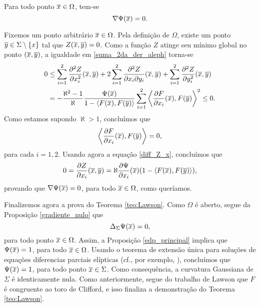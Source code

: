 \begin{proposicao} \label{gradiente_nulo}
Para todo ponto $\overline{x}\in\Omega$, tem-se
\[
\nabla \Psi(\overline{x})=0.
\] 
\end{proposicao}
\begin{demonstracao}
Fixemos um ponto arbitr\'ario $\overline{x}\in\Omega$. Pela defini\c c\~ao
de $\Omega$, existe um ponto $\overline{y}\in\Sigma\setminus\{x\}$ tal que 
$Z(\overline{x},\overline{y})=0$. Como a fun\c c\~ao $Z$ atinge seu m\'inimo
global no ponto $(\overline{x},\overline{y})$, a igualdade em 
\eqref{suma_2da_der_aleph} torna-se
\begin{equation*} 
\begin{aligned}
0 & \leq
\sum_{i=1}^2 \frac{\partial^2 Z}{\partial x_i^2}(\overline{x},\overline{y}) + 
2 \sum_{i=1}^2 \frac{\partial^2 Z}{\partial x_i \partial y_i}(\overline{x},\overline{y}) + 
\sum_{i=1}^2 \frac{\partial^2 Z}{\partial y_i^2}(\overline{x},\overline{y})  \\
& = - 
\frac{\aleph^2 - 1}{\aleph} \frac{\Psi(\overline{x})}{1 - \langle F(\overline{x}), 
F(\overline{y}) \rangle} \sum_{i=1}^2 \left\langle \frac{\partial F}
{\partial x_i}(\overline{x}), F(\overline{y}) \right\rangle^2 \leq 0.
\end{aligned}
\end{equation*}
Como estamos supondo $\aleph>1$, conclu\'imos que
\[
\left\langle \frac{\partial F}{\partial x_i}(\overline{x}), F(\overline{y}) \right\rangle = 0,
\]
para cada $i=1,2$. Usando agora a equação \eqref{diff_Z_x},
conclu\'imos que 
\[
0 = \frac{\partial Z}{\partial x_i}(\overline{x},\overline{y}) = 
\aleph \frac{\partial \Psi}{\partial x_i}(\overline{x})
(1 - \langle F(\overline{x}),F(\overline{y}) \rangle),
\]
provando que $\nabla\Psi(\overline{x})=0$, para todo $\overline{x}\in\Omega$, como
quer\'iamos.
\end{demonstracao}

Finalizemos agora a prova do Teorema \ref{teo:Lawson}. Como
$\Omega$ \'e aberto, segue da Proposi\c c\~ao \ref{gradiente_nulo}
que
\[
\Delta_\Sigma\Psi(\overline{x})=0,
\]
para todo ponto $\overline{x}\in\Omega$. Assim, a Proposi\c c\~ao 
\ref{edp_principal} implica que $\Psi(\overline{x})=1$, para todo
$\overline{x}\in\Omega$. Usando o teorema de extens\~ao \'unica
para solu\c c\~oes de equa\c c\~oes diferencias parciais
el\'ipticas (cf., por exemplo, \cite{Aronszajn1957}), conclu\'imos
que $\Psi(\overline{x})=1$, para todo ponto $\overline{x}\in\Sigma$. Como
consequ\^encia, a curvatura Gaussiana de $\Sigma$ \'e
identicamente nula. Como anteriormente, segue do trabalho
de Lawson \cite{Lawson1969} que $F$ \'e congruente ao
toro de Clifford, e isso finaliza a demonstra\c c\~ao do
Teorema \ref{teo:Lawson}.